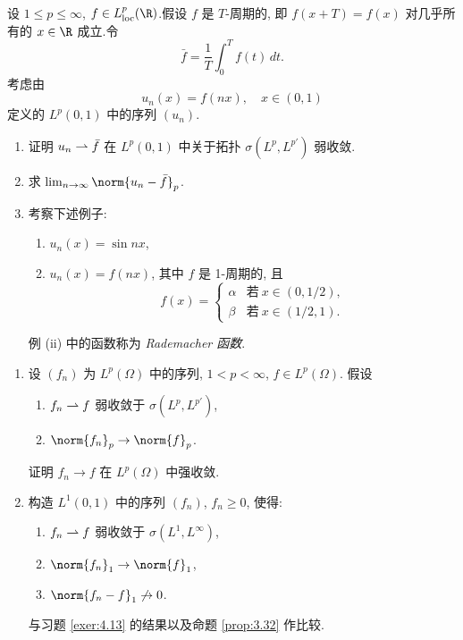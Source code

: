 \begin{exercise}[Rademacher 函数]
\label{exer:4.18}
设 $1\le p\le\infty$, $f\in L^p_{\mathrm{loc}}(\R)$.假设 $f$ 是 $T$-周期的,
即 $f(x+T)=f(x)$ 对几乎所有的 $x\in\R$ 成立.令
\begin{equation*}
\bar f=\frac1T\int_0^Tf(t)\,dt.
\end{equation*}
考虑由
\begin{equation*}
u_n(x)=f(nx),\quad x\in(0,1)
\end{equation*}
定义的 $L^p(0,1)$ 中的序列 $(u_n)$.
\begin{enumerate}[label=\arabic*., leftmargin=2.2em, itemsep=0.35em]
	\item 证明 $u_n\rightharpoonup\bar f$ 在 $L^p(0,1)$ 中关于拓扑 $\sigma(L^p,L^{p'})$
	      弱收敛.
	\item 求 $\lim_{n\to\infty}\norm{u_n-\bar f}_p$.
	\item 考察下述例子:
	      \begin{enumerate}[label=(\roman*), leftmargin=2.4em, itemsep=0.1em]
	      	\item $u_n(x)=\sin nx$,
	      	\item $u_n(x)=f(nx)$, 其中 $f$ 是 1-周期的, 且
	      	      \begin{equation*}
	      	      f(x)=\begin{cases}
	      	      \alpha & \text{若}\ x\in(0,1/2),\\
	      	      \beta & \text{若}\ x\in(1/2,1).
	      	      \end{cases}
	      	      \end{equation*}
	      \end{enumerate}
	      例 (ii) 中的函数称为 \emph{Rademacher 函数}.
\end{enumerate}
\end{exercise}

\begin{exercise}
\label{exer:4.19}
\begin{enumerate}[label=\arabic*., leftmargin=2.2em, itemsep=0.35em]
	\item 设 $(f_n)$ 为 $L^p(\Omega)$ 中的序列, $1<p<\infty$, $f\in L^p(\Omega)$.
	      假设
	      \begin{enumerate}[label=(\roman*), leftmargin=2.4em, itemsep=0.1em]
	      	\item $f_n\rightharpoonup f$ 弱收敛于 $\sigma(L^p,L^{p'})$,
	      	\item $\norm{f_n}_p\to\norm{f}_p$.
	      \end{enumerate}
	      证明 $f_n\to f$ 在 $L^p(\Omega)$ 中强收敛.
	\item 构造 $L^1(0,1)$ 中的序列 $(f_n)$, $f_n\ge0$, 使得:
	      \begin{enumerate}[label=(\roman*), leftmargin=2.4em, itemsep=0.1em]
	      	\item $f_n\rightharpoonup f$ 弱收敛于 $\sigma(L^1,L^\infty)$,
	      	\item $\norm{f_n}_1\to\norm{f}_1$,
	      	\item $\norm{f_n-f}_1\not\to0$.
	      \end{enumerate}
	      与习题  \ref{exer:4.13} 的结果以及命题  \ref{prop:3.32} 作比较.
\end{enumerate}
\end{exercise}

